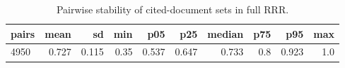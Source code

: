 \begin{table}[ht]
\centering
\caption{Pairwise stability of cited-document sets in full RRR.}
\begin{tabular}{lrrrrrrrrr}
\toprule
pairs & mean & sd & min & p05 & p25 & median & p75 & p95 & max \\
\midrule
4950 & 0.727 & 0.115 & 0.35 & 0.537 & 0.647 & 0.733 & 0.8 & 0.923 & 1.0 \\
\bottomrule
\end{tabular}
\end{table}
